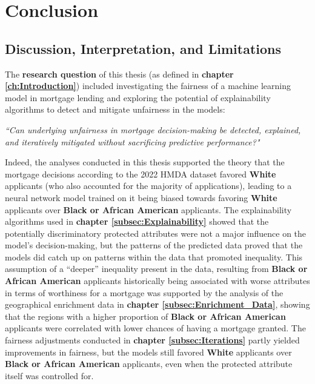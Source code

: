 \chapter{Conclusion}\label{ch:discussion}

\section{Discussion, Interpretation, and Limitations}\label{sec:discussion}


The \textbf{research question} of this thesis (as defined in \textbf{chapter \ref{ch:Introduction}}) included investigating the fairness of a machine learning model in mortgage lending and exploring the potential of explainability algorithms to detect and mitigate unfairness in the models:

\textit{“Can underlying unfairness in mortgage decision-making be detected, explained, and iteratively mitigated without sacrificing predictive performance?"} %


Indeed, the analyses conducted in this thesis supported the theory that the mortgage decisions according to the 2022 HMDA dataset favored \textbf{White} applicants (who also accounted for the majority of applications), leading to a neural network model trained on it being biased towards favoring \textbf{White} applicants over \textbf{Black or African American} applicants.
The explainability algorithms used in \textbf{chapter \ref{subsec:Explainability}} showed that the potentially discriminatory protected attributes were not a major influence on the model’s decision-making, but the patterns of the predicted data proved that the models did catch up on patterns within the data that promoted inequality.
This assumption of a “deeper” inequality present in the data, resulting from \textbf{Black or African American} applicants historically being associated with worse attributes in terms of worthiness for a mortgage was supported by the analysis of the geographical enrichment data in \textbf{chapter \ref{subsec:Enrichment_Data}}, showing that the regions with a higher proportion of \textbf{Black or African American} applicants were correlated with lower chances of having a mortgage granted.
The fairness adjustments conducted in \textbf{chapter \ref{subsec:Iterations}} partly yielded improvements in fairness, but the models still favored \textbf{White} applicants over \textbf{Black or African American} applicants, even when the protected attribute itself was controlled for.

